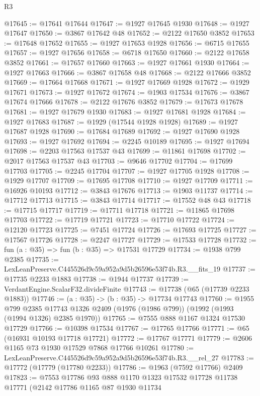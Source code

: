 \begin{lexlean}{R3}
\begin{coremodule}
@17645 := @17641 @17644
@17647 := @1927 @17645 @1930
@17648 := @1927 @17647
@17650 := @3867 @17642 @48
@17652 := @2122 @17650 @3852
@17653 := @17648 @17652
@17655 := @1927 @17653 @1928
@17656 := @6715 @17655
@17657 := @1927 @17656
@17658 := @6718 @17650
@17660 := @2122 @17658 @3852
@17661 := @17657 @17660
@17663 := @1927 @17661 @1930
@17664 := @1927 @17663
@17666 := @3867 @17658 @48
@17668 := @2122 @17666 @3852
@17669 := @17664 @17668
@17671 := @1927 @17669 @1928
@17672 := @1929 @17671
@17673 := @1927 @17672
@17674 := @1903 @17534
@17676 := @3867 @17674 @17666
@17678 := @2122 @17676 @3852
@17679 := @17673 @17678
@17681 := @1927 @17679 @1930
@17683 := @1927 @17681 @1928
@17684 := @1927 @17683
@17687 := @1929 (@17544 @1928 @1928)
@17689 := @1927 @17687 @1928
@17690 := @17684 @17689
@17692 := @1927 @17690 @1928
@17693 := @1927 @17692
@17694 := @2245 @10189
@17695 := @1927 @17694
@17698 := @2203 @17563 @17537 @43
@17699 := @11861 @17698
@17702 := @2017 @17563 @17537 @43
@17703 := @9646 @17702
@17704 := @17699 @17703
@17705 := @2245 @17704
@17707 := @1927 @17705 @1928
@17708 := @1929 @17707
@17709 := @17695 @17708
@17710 := @1927 @17709
@17711 := @16926 @10193
@17712 := @3843 @17676
@17713 := @1903 @11737
@17714 := @17712 @17713
@17715 := @3843 @17714
@17717 := @17552 @48 @43
@17718 := @17715 @17717
@17719 := @17711 @17718
@17721 := @11865 @17698 @17703
@17722 := @17719 @17721
@17723 := @17710 @17722
@17724 := @12120 @17723
@17725 := @7451 @17724
@17726 := @17693 @17725
@17727 := @17567 @17726
@17728 := @2247 @17727
@17729 := @17533 @17728
@17732 := fun (a : @35) => fun (b : @35) => @17531 @17729
@17734 := @1938 @799 @2385
@17735 := LexLeanPreserve.C445526d9c59a952a9d5b26596e53f74b.R3.__fits_19
@17737 := @17735 @2233 @1883
@17738 := @1944 @17737
@17739 := VerdantEngine.ScalarF32.divideFinite
@17743 := @17738 (@65 (@17739 @2233 @1883))
@17746 := (a : @35) -> (b : @35) -> @17734 @17743
@17760 := @1955
    @799
    @2385
    @17743
    @1326
    @2409
    (@1976 (@1986 @799))
    (@1992 (@1993 (@1994 @1326) @2385 @1970))
@17765 := @7555 @888 @1167 @1324 @17530 @17729
@17766 := @10398 @17534
@17767 := @17765 @17766
@17771 := @65 (@16931 @10193 @17718 @17721)
@17772 := @17767 @17771
@17779 := @2606 @1165 @73 @1930 @17529 @7868 @17766 @10261
@17780 := LexLeanPreserve.C445526d9c59a952a9d5b26596e53f74b.R3.__rel_27
@17783 := @17772 (@17779 (@17780 @2233))
@17786 := @1963 (@7592 @17766) @2409
@17823 := @7553
    @17786
    @93
    @888
    @1170
    @1323
    @17532
    @17728
    @11738
    @17771
    (@2142
      @17786
      @1165
      @87
      @1930
      @11734

\end{coremodule}
\end{lexlean}
